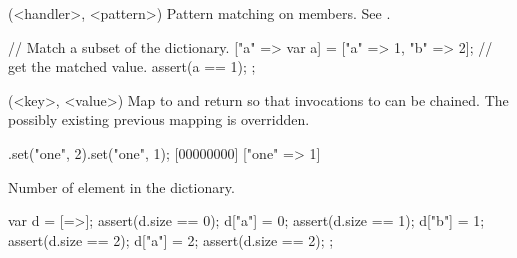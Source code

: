 \begin{urbiscriptapi}
\item[matchAgainst](<handler>, <pattern>)
  Pattern matching on members.  See .

\begin{urbiscript}
{
  // Match a subset of the dictionary.
  ["a" => var a] = ["a" => 1, "b" => 2];
  // get the matched value.
  assert(a == 1);
};
\end{urbiscript}


\item[set](<key>, <value>)%
  Map  to  and return \this so that invocations to
   can be chained.  The possibly existing previous mapping is
  overridden.

\begin{urbiscript}
[=>].set("one", 2).set("one", 1);
[00000000] ["one" => 1]
\end{urbiscript}


\item[size]
  Number of element in the dictionary.

\begin{urbiscript}
{
  var d = [=>];
  assert(d.size == 0);
  d["a"] = 0;
  assert(d.size == 1);
  d["b"] = 1;
  assert(d.size == 2);
  d["a"] = 2;
  assert(d.size == 2);
};
\end{urbiscript}



\end{urbiscriptapi}



